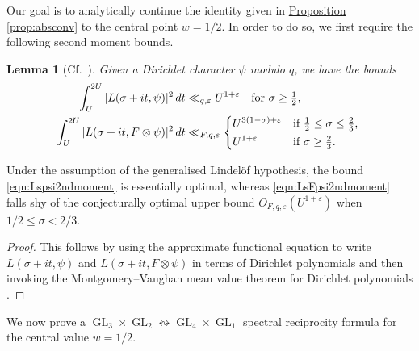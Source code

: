 \documentclass[11pt,a4paper]{amsart}
\newcommand{\e}{\varepsilon}
\DeclareMathOperator{\GL}{GL}
\numberwithin{equation}{section}
\newtheorem{lemma}[equation]{Lemma}
\theoremstyle{remark}
\theoremstyle{definition}
\begin{document}
Our goal is to analytically continue the identity given in \hyperref[prop:absconv]{Proposition \ref*{prop:absconv}} to the central point $w = 1/2$. In order to do so, we first require the following second moment bounds.

\begin{lemma}[Cf.\ {\cite[Lemma 3.8]{HK25}}]
\label{lem:integralsecondmomentbounds}
Given a Dirichlet character $\psi$ modulo $q$, we have the bounds
\begin{align}
\label{eqn:Lspsi2ndmoment}
\int_{U}^{2U} |L(\sigma + it,\psi)|^2 \, dt & \ll_{q,\e} U^{1 + \e} \quad \text{for $\sigma \geq \tfrac{1}{2}$},	\\
\label{eqn:LsFpsi2ndmoment}
\int_{U}^{2U} |L(\sigma + it,F \otimes \psi)|^2 \, dt & \ll_{F,q,\e} \begin{dcases*}
U^{3(1 - \sigma) + \e} & if $\frac{1}{2} \leq \sigma \leq \frac{2}{3}$,	\\
U^{1 + \e} & if $\sigma \geq \frac{2}{3}$.
\end{dcases*}
\end{align}
\end{lemma}

Under the assumption of the generalised Lindel\"{o}f hypothesis, the bound \eqref{eqn:Lspsi2ndmoment} is essentially optimal, whereas \eqref{eqn:LsFpsi2ndmoment} falls shy of the conjecturally optimal upper bound $O_{F,q,\e}(U^{1 + \e})$ when $1/2 \leq \sigma < 2/3$.

\begin{proof}
This follows by using the approximate functional equation \cite[Theorem 5.3]{IK04} to write $L(\sigma + it,\psi)$ and $L(\sigma + it,F \otimes \psi)$ in terms of Dirichlet polynomials and then invoking the Montgomery--Vaughan mean value theorem for Dirichlet polynomials \cite[Corollary 3]{MV74}.
\end{proof}

We now prove a $\GL_3 \times \GL_2 \leftrightsquigarrow \GL_4 \times \GL_1$ spectral reciprocity formula for the central value $w = 1/2$. 
\end{document}
